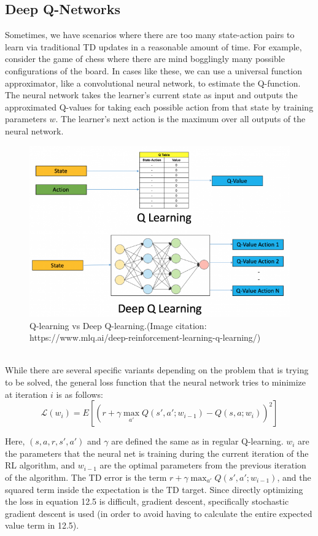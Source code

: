 \subsection{Deep Q-Networks}
Sometimes, we have scenarios where there are too many state-action pairs to learn via traditional TD updates in a reasonable amount of time. For example, consider the game of chess where there are mind bogglingly many possible configurations of the board. In cases like these, we can use a universal function approximator, like a convolutional neural network, to estimate the Q-function. The neural network takes the learner's current state as input and outputs the approximated Q-values for taking each possible action from that state by training parameters $w$. The learner's next action is the maximum over all outputs of the neural network.
\begin{figure}[ht!]
    \centering
    \includegraphics[scale=0.6]{../ReinforcementLearning/fig/deep-q-learning.png}
    \caption{Q-learning vs Deep Q-learning.(Image citation: https://www.mlq.ai/deep-reinforcement-learning-q-learning/)}
    \label{fig:my_label}
\end{figure}\\
While there are several specific variants depending on the problem that is trying to be solved, the general loss function that the neural network tries to minimize at iteration $i$ is as follows:
\begin{equation}
    \mathcal{L}(w_i) = E[(r + \gamma\max_{a'}Q(s', a'; w_{i-1}) - Q(s, a; w_i))^2]
\end{equation}

Here, $(s, a, r, s', a')$ and $\gamma$ are defined the same as in regular Q-learning. $w_i$ are the parameters that the neural net is training during the current iteration of the RL algorithm, and $w_{i-1}$ are the optimal parameters from the previous iteration of the algorithm. The TD error is the term $r + \gamma\max_{a'}Q(s', a';w_{i-1})$, and the squared term inside the expectation is the TD target. Since directly optimizing the loss in equation 12.5 is difficult, gradient descent, specifically stochastic gradient descent is used (in order to avoid having to calculate the entire expected value term in 12.5).\\

